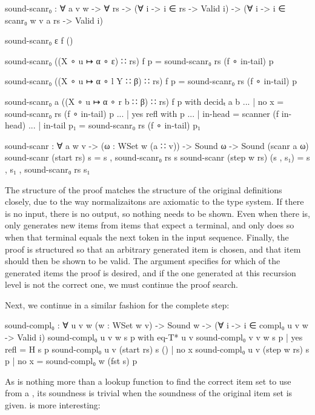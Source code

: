 		\begin{code}
			sound-scanr₀ : ∀ {a v w} -> ∀ rs ->
			  (∀ {i} -> i ∈ rs -> Valid i) ->
			  (∀ {i} -> i ∈ scanr₀ {w} {v} a rs -> Valid i)

			sound-scanr₀ ε f ()

			sound-scanr₀ ((X ∘ u ↦ α ∘ ε) ∷ rs) f p = 
			  sound-scanr₀ rs (f ∘ in-tail) p

			sound-scanr₀ ((X ∘ u ↦ α ∘ l Y ∷ β) ∷ rs) f p = 
			  sound-scanr₀ rs (f ∘ in-tail) p

			sound-scanr₀ {a} ((X ∘ u ↦ α ∘ r b ∷ β) ∷ rs) f p with decidₜ a b
			... | no x = sound-scanr₀ rs (f ∘ in-tail) p
			... | yes refl with p
			...            | in-head    = scanner (f in-head)
			...            | in-tail p₁ = sound-scanr₀ rs (f ∘ in-tail) p₁

			sound-scanr : ∀ {a w v} -> (ω : WSet w (a ∷ v)) ->
			  Sound ω -> Sound (scanr a ω)
			sound-scanr (start rs) s = s , sound-scanr₀ rs s
			sound-scanr (step w rs) (s , s₁) = s , s₁ , sound-scanr₀ rs s₁
		\end{code}

		The structure of the proof matches the structure of the original
		definitions closely, due to the way normalizaitons are axiomatic to the
		type system. If there is no input, there is no output, so nothing
		needs to be shown. Even when there is,  only generates
		new items from items that expect a terminal, and only does so when that
		terminal equals the next token in the input sequence. Finally, the
		proof is structured so that an arbitrary generated item is chosen, and
		that item should then be shown to be valid. The argument 
		specifies for which of the generated items the proof is desired, and if
		the one generated at this recursion level is not the correct one, we
		must continue the proof search.

		Next, we continue in a similar fashion for the complete step:

		\begin{code}
			sound-compl₀ : ∀ {u v w} (w : WSet w v) ->
			  Sound w -> (∀ {i} -> i ∈ compl₀ {u} {v} w -> Valid i)
			sound-compl₀ {u} {v} w s p           with eq-T* u v
			sound-compl₀ {v} {v} w s p           | yes refl = H s p
			sound-compl₀ {u} {v} (start rs) s () | no x
			sound-compl₀ {u} {v} (step w rs) s p | no x = sound-compl₀ w (fst s) p
		\end{code}

		As  is nothing more than a lookup function to find
		the correct item set to use from a , its soundness is
		trivial when the soundness of the original item set is given.
		 is more interesting:

